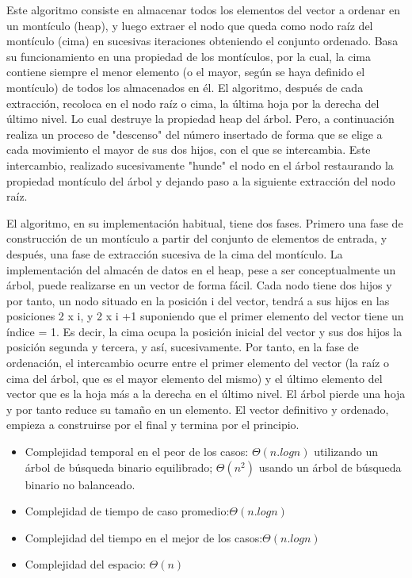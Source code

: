 \documentclass{article}
\begin{document}
	Este algoritmo consiste en almacenar todos los elementos del vector a ordenar en un montículo (heap), y luego extraer el nodo que queda como nodo raíz del montículo (cima) en sucesivas iteraciones obteniendo el conjunto ordenado. Basa su funcionamiento en una propiedad de los montículos, por la cual, la cima contiene siempre el menor elemento (o el mayor, según se haya definido el montículo) de todos los almacenados en él. El algoritmo, después de cada extracción, recoloca en el nodo raíz o cima, la última hoja por la derecha del último nivel. Lo cual destruye la propiedad heap del árbol. Pero, a continuación realiza un proceso de "descenso" del número insertado de forma que se elige a cada movimiento el mayor de sus dos hijos, con el que se intercambia. Este intercambio, realizado sucesivamente "hunde" el nodo en el árbol restaurando la propiedad montículo del árbol y dejando paso a la siguiente extracción del nodo raíz.
	
	El algoritmo, en su implementación habitual, tiene dos fases. Primero una fase de construcción de un montículo a partir del conjunto de elementos de entrada, y después, una fase de extracción sucesiva de la cima del montículo. La implementación del almacén de datos en el heap, pese a ser conceptualmente un árbol, puede realizarse en un vector de forma fácil. Cada nodo tiene dos hijos y por tanto, un nodo situado en la posición i del vector, tendrá a sus hijos en las posiciones 2 x i, y 2 x i +1 suponiendo que el primer elemento del vector tiene un índice = 1. Es decir, la cima ocupa la posición inicial del vector y sus dos hijos la posición segunda y tercera, y así, sucesivamente. Por tanto, en la fase de ordenación, el intercambio ocurre entre el primer elemento del vector (la raíz o cima del árbol, que es el mayor elemento del mismo) y el último elemento del vector que es la hoja más a la derecha en el último nivel. El árbol pierde una hoja y por tanto reduce su tamaño en un elemento. El vector definitivo y ordenado, empieza a construirse por el final y termina por el principio.


 \begin{itemize}
          \item Complejidad temporal en el peor de los casos: $\Theta (n.log n)$  utilizando un árbol de búsqueda binario equilibrado; $\Theta (n^2)$ usando un árbol de búsqueda binario no balanceado.
           \item Complejidad de tiempo de caso promedio:$\Theta (n.log n)$
           \item Complejidad del tiempo en el mejor de los casos:$\Theta (n.log n)$
           \item Complejidad del espacio: $\Theta (n)$

\end{itemize}
\end{document}

